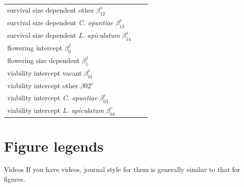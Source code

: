 \documentclass[11pt]{article}
\begin{document}
\begin{table}[]
\begin{tabular}{l|l|l}
    survival size dependent other $\beta_{12}^s$ & & \\
    survival size dependent \textit{C. opuntiae} $\beta_{13}^s$ & & \\
    survival size dependent \textit{L. apiculatum} $\beta_{14}^s$ & & \\
    \hline
    flowering intercept $\beta_0^f$ & & \\
    flowering size dependent $\beta_1^f$ & & \\
    \hline
    viability intercept vacant $\beta_01^v$ & & \\
    viability intercept other $\beta02^v$ & & \\
    viability intercept \textit{C. opuntiae} $\beta_03^v$ & & \\
    viability intercept \textit{L. apiculatum} $\beta_04^v$ & & 
  \end{tabular}
  \end{table}

\section*{Figure legends}


 Videos
 If you have videos, journal style for them is generally similar to that for
 figures. 




\end{document}
